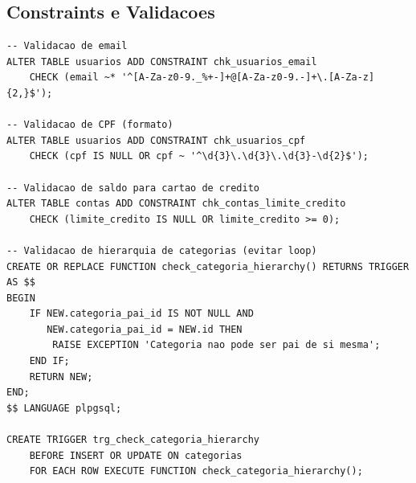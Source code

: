 \subsection{Constraints e Validacoes}

\begin{lstlisting}[caption=Constraints adicionais de integridade]
-- Validacao de email
ALTER TABLE usuarios ADD CONSTRAINT chk_usuarios_email 
    CHECK (email ~* '^[A-Za-z0-9._%+-]+@[A-Za-z0-9.-]+\.[A-Za-z]{2,}$');

-- Validacao de CPF (formato)
ALTER TABLE usuarios ADD CONSTRAINT chk_usuarios_cpf 
    CHECK (cpf IS NULL OR cpf ~ '^\d{3}\.\d{3}\.\d{3}-\d{2}$');

-- Validacao de saldo para cartao de credito
ALTER TABLE contas ADD CONSTRAINT chk_contas_limite_credito 
    CHECK (limite_credito IS NULL OR limite_credito >= 0);

-- Validacao de hierarquia de categorias (evitar loop)
CREATE OR REPLACE FUNCTION check_categoria_hierarchy() RETURNS TRIGGER AS $$
BEGIN
    IF NEW.categoria_pai_id IS NOT NULL AND 
       NEW.categoria_pai_id = NEW.id THEN
        RAISE EXCEPTION 'Categoria nao pode ser pai de si mesma';
    END IF;
    RETURN NEW;
END;
$$ LANGUAGE plpgsql;

CREATE TRIGGER trg_check_categoria_hierarchy
    BEFORE INSERT OR UPDATE ON categorias
    FOR EACH ROW EXECUTE FUNCTION check_categoria_hierarchy();
\end{lstlisting}
